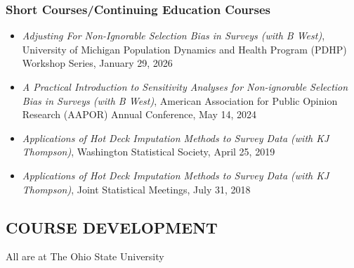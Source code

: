 \documentclass[
  english,
  letterpaper,
  DIV=11,
  numbers=noendperiod]{scrartcl}
\providecommand{\tightlist}{%
  \setlength{\itemsep}{0pt}\setlength{\parskip}{0pt}}
\begin{document}
\subsubsection{Short Courses/Continuing Education
Courses}\label{short-coursescontinuing-education-courses}

\begin{itemize}
\tightlist
\item
  \emph{Adjusting For Non-Ignorable Selection Bias in Surveys (with B
  West)}, University of Michigan Population Dynamics and Health Program
  (PDHP) Workshop Series, January 29, 2026
\item
  \emph{A Practical Introduction to Sensitivity Analyses for
  Non-ignorable Selection Bias in Surveys (with B West)}, American
  Association for Public Opinion Research (AAPOR) Annual Conference, May
  14, 2024
\item
  \emph{Applications of Hot Deck Imputation Methods to Survey Data (with
  KJ Thompson)}, Washington Statistical Society, April 25, 2019
\item
  \emph{Applications of Hot Deck Imputation Methods to Survey Data (with
  KJ Thompson)}, Joint Statistical Meetings, July 31, 2018
\end{itemize}

\subsection{COURSE DEVELOPMENT}\label{course-development}

All are at The Ohio State University
\end{document}
